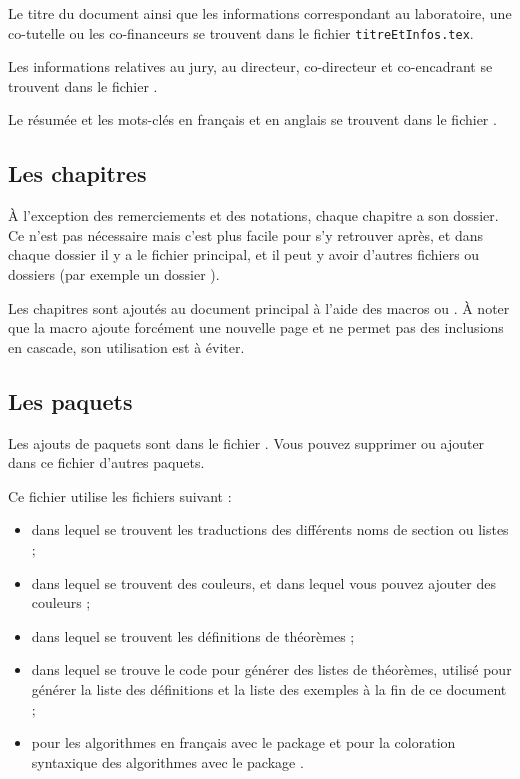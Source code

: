   Le titre du document ainsi que les informations correspondant au laboratoire, une co-tutelle ou les co-financeurs se trouvent dans le fichier \texttt{titreEtInfos.tex}.

  Les informations relatives au jury, au directeur, co-directeur et co-encadrant se trouvent dans le fichier .

  Le résumée et les mots-clés en français et en anglais se trouvent dans le fichier .

  \subsection{Les chapitres}
  À l'exception des remerciements et des notations, chaque chapitre a son dossier.
  Ce n'est pas nécessaire mais c'est plus facile pour s'y retrouver après, et dans chaque dossier il y a le fichier principal, et il peut y avoir d'autres fichiers ou dossiers (par exemple un dossier ).

  Les chapitres sont ajoutés au document principal à l'aide des macros \verb|| ou \verb||. À noter que la macro \verb|| ajoute forcément une nouvelle page et ne permet pas des inclusions en cascade, son utilisation est à éviter.

  \subsection{Les paquets}
  Les ajouts de paquets sont dans le fichier . Vous pouvez supprimer ou ajouter dans ce fichier d'autres paquets.

  Ce fichier utilise les fichiers suivant :
  \begin{itemize}
    \item {} dans lequel se trouvent les traductions des différents noms de section ou listes ;
    \item {} dans lequel se trouvent des couleurs, et dans lequel vous pouvez ajouter des couleurs ;
    \item {} dans lequel se trouvent les définitions de théorèmes ;
    \item {} dans lequel se trouve le code pour générer des listes de théorèmes, utilisé pour générer la liste des définitions et la liste des exemples à la fin de ce document ;
    \item {} pour les algorithmes en français avec le package  et  pour la coloration syntaxique des algorithmes avec le package .
  \end{itemize}

